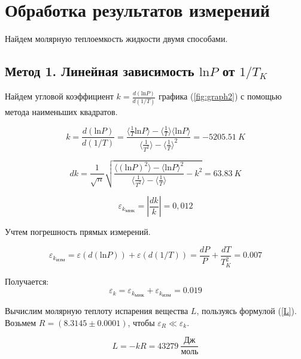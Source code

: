 \documentclass[a4paper,12pt]{article} %
\begin{document}
\section*{Обработка результатов измерений}

Найдем молярную теплоемкость жидкости двумя способами.

\subsection*{Метод 1. Линейная зависимость $\mbox{ln}P$ от $1/T_K$}

Найдем угловой коэффициент $k = \frac{d(\mbox{ln}P)}{d(1/T)}$ графика (\ref{fig:graph2}) с помощью метода наименьших квадратов.

\begin{equation}
  \label{k}
  k = \frac{d(\mbox{ln}P)}{d(1/T)} = \frac{\langle \frac{1}{T} \mbox{ln}P \rangle - \langle \frac{1}{T} \rangle \langle \mbox{ln}P \rangle}{\langle \frac{1}{T^2} \rangle - \langle \frac{1}{T} \rangle ^2} = - 5205.51\ K 
\end{equation}

\begin{equation}
  \label{dk}
  dk = \frac{1}{\sqrt{n}} \sqrt{\frac{\langle (\mbox{ln}P)^2 \rangle - \langle \mbox{ln}P \rangle ^2}{\langle \frac{1}{T^2} \rangle - \langle \frac{1}{T} \rangle} - k^2} = 63.83\ K 
\end{equation}

\begin{equation}
  \label{ek}
  \varepsilon_{k_{\text{МНК}}} = \left| \frac{dk}{k} \right| = 0,012
\end{equation}

Учтем погрешность прямых измерений.

\begin{equation}
  \varepsilon_{k_{\text{ИЗМ}}}= \varepsilon ({d(\mbox{ln}P)}) + \varepsilon({d(1/T)}) = \frac{dP}{P} + \frac{dT}{T_K^2} = 0.007
\end{equation}

Получается:
\begin{equation}
  \varepsilon_k = \varepsilon_{k_{\text{МНК}}} + \varepsilon_{k_{\text{ИЗМ}}} = 0.019
\end{equation}

Вычислим молярную теплоту испарения вещества $L$, пользуясь формулой (\ref{L}). Возьмем $R = (8.3145 \pm 0.0001)$, чтобы $\varepsilon_R \ll \varepsilon_k$.

\begin{equation}
  L = -kR = 43 279\ \frac{\mbox{Дж}}{\mbox{моль}}
\end{equation}
\end{document}
